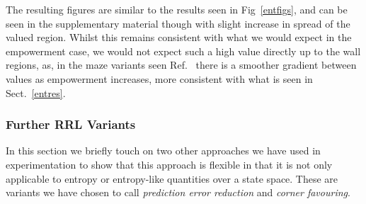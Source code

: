 \documentclass{article}
\begin{document}
The resulting figures are similar to the results seen in Fig~\ref{entfigs}, and can be seen in the supplementary material%
though with slight increase in spread of the valued region. Whilst this remains consistent with what we would expect in the empowerment case, we would not expect such a high value directly up to the wall regions, as, in the maze variants seen Ref.~\citep{klyubin2005empowerment} there is a smoother gradient between values as empowerment increases, more consistent with what is seen in Sect.~\ref{entres}. %

\subsubsection{Further RRL Variants}
In this section we briefly touch on two other approaches we have used in experimentation to show that this approach is flexible in that it is not only applicable to entropy or entropy-like quantities over a state space. These are variants we have chosen to call \emph{prediction error reduction} and \emph{corner favouring}.
\end{document}

